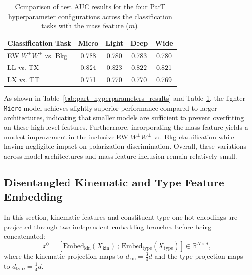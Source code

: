 \documentclass[12pt]{article}
\begin{document}
		\begin{table}[htbp]
			\centering
			\caption{Comparison of test AUC results for the four ParT hyperparameter configurations across the classification tasks with the mass feature ($m$).}
			\label{tab:part_mass_feature_results}
			\begin{tabular}{l|cccc}
				\hline
				\hline
                Classification Task      & Micro & Light & Deep  & Wide  \\ \hline
                EW $W^\pm W^\pm$ vs. Bkg & 0.788 & 0.780 & 0.783 & 0.780 \\
                LL vs. TX                & 0.824 & 0.823 & 0.822 & 0.821 \\
                LX vs. TT                & 0.771 & 0.770 & 0.770 & 0.769 \\
				\hline
				\hline
			\end{tabular}
		\end{table}

		As shown in Table~\ref{tab:part_hyperparameters_results} and Table~\ref{tab:part_mass_feature_results}, the lighter \texttt{Micro} model achieves slightly superior performance compared to larger architectures, indicating that smaller models are sufficient to prevent overfitting on these high-level features. Furthermore, incorporating the mass feature yields a modest improvement in the inclusive EW $W^\pm W^\pm$ vs. Bkg classification while having negligible impact on polarization discrimination. Overall, these variations across model architectures and mass feature inclusion remain relatively small.


	\subsection{Disentangled Kinematic and Type Feature Embedding}%
	\label{sub:disentangled_kinematic_and_type_feature_embedding}

		In this section, kinematic features and constituent type one-hot encodings are projected through two independent embedding branches before being concatenated:
		\begin{equation}
			x^0 = \left[ \text{Embed}_{\text{kin}}(X_{\text{kin}}) \;;\, \text{Embed}_{\text{type}}(X_{\text{type}}) \right] \in \mathbb{R}^{N \times d},
		\end{equation}
		where the kinematic projection maps to $d_{\text{kin}} = \frac{3}{4}d$ and the type projection maps to $d_{\text{type}} = \frac{1}{4}d$.
\end{document}
